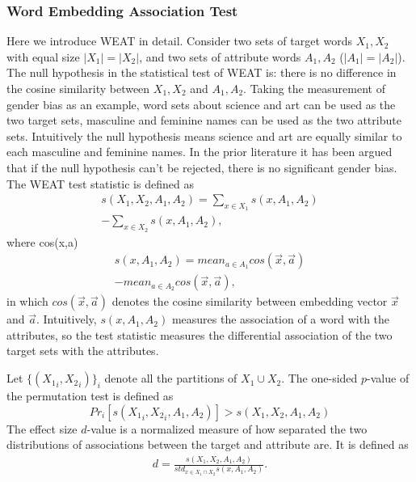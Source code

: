 \subsubsection{Word Embedding Association Test}
\label{sec:weat}
Here we introduce WEAT in detail. Consider two sets of target words $X_1,X_2$ with equal size $|X_1|=|X_2|$, and two sets of attribute words $A_1,A_2$ ($|A_1|=|A_2|$). The null hypothesis in the statistical test of WEAT is: there is no difference in the cosine similarity between $X_1,X_2$ and $A_1,A_2$. Taking the measurement of gender bias as an example, word sets about science and art can be used as the two target sets, masculine and feminine names can be used as the two attribute sets. Intuitively the null hypothesis means science and art are equally similar to each masculine and feminine names. In the prior literature it has been argued that if the null hypothesis can't be rejected, there is no significant gender bias. The WEAT test statistic is defined as
\begin{eqnarray}
s(X_1,X_2,A_1,A_2)=\sum_{x\in X_1}s(x,A_1,A_2)\nonumber\\
-\sum_{x\in X_2}s(x,A_1,A_2),\nonumber
\end{eqnarray}
where cos(x,a)
\begin{eqnarray}
s(x,A_1,A_2)=mean_{a\in A_1}cos(\vec{x},\vec{a})\nonumber\\
-mean_{a\in A_2}cos(\vec{x},\vec{a}),\nonumber
\end{eqnarray}
in which $cos(\vec{x},\vec{a})$ denotes the cosine similarity between embedding vector $\vec{x}$ and $\vec{a}$. Intuitively, $s(x,A_1,A_2)$ measures the association of a word with the attributes, so the test statistic measures the differential association of the two target sets with the attributes. 

Let $\{({X_1}_i,{X_2}_i)\}_{i}$ denote all the partitions of $X_1\cup X_2$. The one-sided $p$-value of the permutation test is defined as $$Pr_i[s({X_1}_i,{X_2}_i,A_1,A_2)]>s(X_1,X_2,A_1,A_2)$$
The effect size $d$-value is a normalized measure of how separated the two distributions of associations between the target and attribute are. It is defined as
\begin{eqnarray}
d=\frac{s(X_1,X_2,A_1,A_2)}{std_{x\in X_1 \cap X_2}s(x,A_1,A_2)}.\nonumber
\end{eqnarray}

